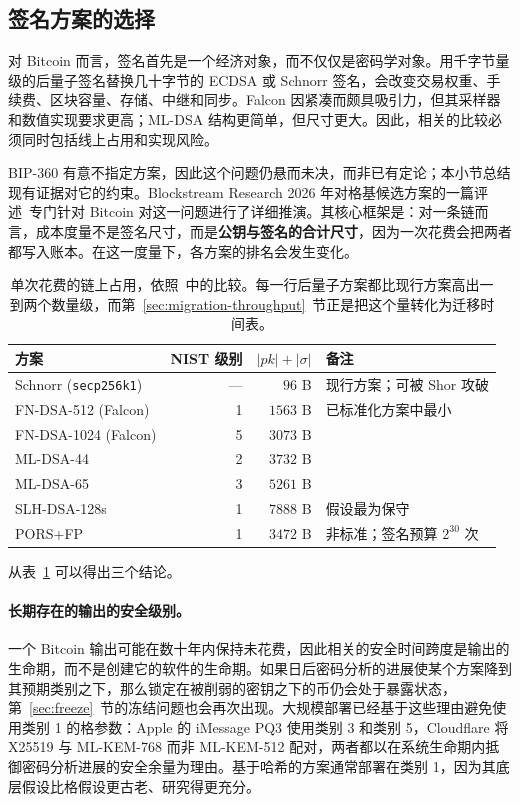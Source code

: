 \subsection{签名方案的选择}
\label{sec:bitcoin-scheme-choice}

对 Bitcoin 而言，签名首先是一个经济对象，而不仅仅是密码学对象。用千字节量级的后量子签名替换几十字节的 ECDSA 或 Schnorr 签名，会改变交易权重、手续费、区块容量、存储、中继和同步。Falcon 因紧凑而颇具吸引力，但其采样器和数值实现要求更高；ML-DSA 结构更简单，但尺寸更大。因此，相关的比较必须同时包括线上占用和实现风险。

BIP-360 有意不指定方案，因此这个问题仍悬而未决，而非已有定论；本小节总结现有证据对它的约束。Blockstream Research 2026 年对格基候选方案的一篇评述~\cite{blockstreamlattice2026}专门针对 Bitcoin 对这一问题进行了详细推演。其核心框架是：对一条链而言，成本度量不是签名尺寸，而是\textbf{公钥与签名的合计尺寸}，因为一次花费会把两者都写入账本。在这一度量下，各方案的排名会发生变化。

\begin{table}[H]
\centering
\begin{tabular}{lrrl}
\toprule
方案 & NIST 级别 & $|pk| + |\sigma|$ & 备注 \\
\midrule
Schnorr (\texttt{secp256k1}) & --- & $96$ B & 现行方案；可被 Shor 攻破 \\
\midrule
FN-DSA-512 (Falcon)   & 1 & $1563$ B & 已标准化方案中最小 \\
FN-DSA-1024 (Falcon)  & 5 & $3073$ B & \\
ML-DSA-44             & 2 & $3732$ B & \\
ML-DSA-65             & 3 & $5261$ B & \\
\midrule
SLH-DSA-128s          & 1 & $7888$ B & 假设最为保守 \\
PORS+FP               & 1 & $3472$ B & 非标准；签名预算 $2^{30}$ 次 \\
\bottomrule
\end{tabular}
\caption{单次花费的链上占用，依照~\cite{blockstreamlattice2026}中的比较。每一行后量子方案都比现行方案高出一到两个数量级，而第~\ref{sec:migration-throughput}~节正是把这个量转化为迁移时间表。}
\label{tab:bitcoin-scheme-sizes}
\end{table}

从表~\ref{tab:bitcoin-scheme-sizes} 可以得出三个结论。

\paragraph{长期存在的输出的安全级别。}
一个 Bitcoin 输出可能在数十年内保持未花费，因此相关的安全时间跨度是输出的生命期，而不是创建它的软件的生命期。如果日后密码分析的进展使某个方案降到其预期类别之下，那么锁定在被削弱的密钥之下的币仍会处于暴露状态，第~\ref{sec:freeze}~节的冻结问题也会再次出现。大规模部署已经基于这些理由避免使用类别 1 的格参数：Apple 的 iMessage PQ3 使用类别 3 和类别 5，Cloudflare 将 X25519 与 ML-KEM-768 而非 ML-KEM-512 配对，两者都以在系统生命期内抵御密码分析进展的安全余量为理由。基于哈希的方案通常部署在类别 1，因为其底层假设比格假设更古老、研究得更充分。

